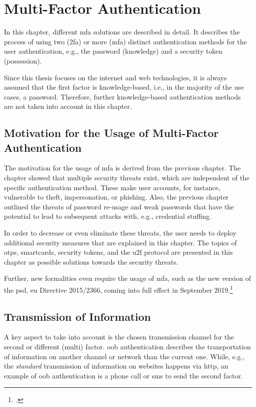 \chapter{Multi-Factor Authentication}
\label{chap:mfa}

In this chapter, different \gls{mfa} solutions are described in detail. It describes the process of using two (\gls{2fa}) or more (\gls{mfa}) distinct authentication methods for the user authentication, e.g., the password (knowledge) and a security token (possession).

Since this thesis focuses on the internet and web technologies, it is always assumed that the first factor is knowledge-based, i.e., in the majority of the use cases, a password. Therefore, further knowledge-based authentication methods are not taken into account in this chapter.

\section{Motivation for the Usage of Multi-Factor Authentication}

The motivation for the usage of \gls{mfa} is derived from the previous chapter. The chapter showed that multiple security threats exist, which are independent of the specific authentication method. These make user accounts, for instance, vulnerable to theft, impersonation, or phishing. Also, the previous chapter outlined the threats of password re-usage and weak passwords that have the potential to lead to subsequent attacks with, e.g., credential stuffing.

 In order to decrease or even eliminate these threats, the user needs to deploy additional security measures that are explained in this chapter. The topics of \glspl{otp}, smartcards, security tokens, and the \gls{u2f} protocol are presented in this chapter as possible solutions towards the security threats.
 
 Further, new formalities even require the usage of \gls{mfa}, such as the new version of the \gls{psd}, \gls{eu} Directive 2015/2366, coming into full effect in September 2019.\footcites[See][10]{NOCTOR20189}

\newpage

\section{Transmission of Information}

A key aspect to take into account is the chosen transmission channel for the second or different (multi) factor. \gls{oob} authentication describes the transportation of information on another channel or network than the current one. While, e.g., the \textit{standard} transmission of information on websites happens via \gls{http}, an example of \gls{oob} authentication is a phone call or \gls{sms} to send the second factor.

